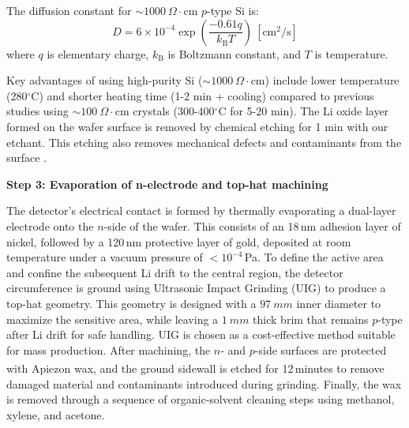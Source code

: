 \noindent The diffusion constant for \(\sim 1000~\Omega\cdot\text{cm}\) \(p\)-type Si is:
\begin{equation}
    D=6\times 10^{-4}\exp\left(\frac{-0.61q}{k_{\text{B}}T}\right)~\left[\text{cm}^2/\text{s}\right]
\end{equation}
\noindent where \(q\) is elementary charge, \(k_{\text{B}}\) is Boltzmann constant, and \(T\) is temperature.

\noindent Key advantages of using high-purity Si (\(\sim 1000~\Omega\cdot\text{cm}\)) include lower temperature (280\(^\circ\)C) and shorter heating time (1-2 min + cooling) compared to previous studies using \(\sim 100~\Omega\cdot\text{cm}\) crystals (300-400\(^\circ\)C for 5-20 min). The Li oxide layer formed on the wafer surface is removed by chemical etching for 1 min with our etchant. This etching also removes mechanical defects and contaminants from the surface \cite{KOZAI2019162695}.
\medskip

\noindent\textbf{Step 3: Evaporation of n-electrode and top-hat machining}

\noindent The detector's electrical contact is formed by thermally evaporating a dual-layer electrode onto the \(n\)-side of the wafer. This consists of an 18\,nm adhesion layer of nickel, followed by a 120\,nm protective layer of gold, deposited at room temperature under a vacuum pressure of \(<10^{-4}\)\,Pa. To define the active area and confine the subsequent Li drift to the central region, the detector circumference is ground using Ultrasonic Impact Grinding (UIG) to produce a top-hat geometry. This geometry is designed with a $97~mm$ inner diameter to maximize the sensitive area, while leaving a $1~mm$ thick brim that remains \(p\)-type after Li drift for safe handling. UIG is chosen as a cost-effective method suitable for mass production. After machining, the \(n\)- and \(p\)-side surfaces are protected with Apiezon\textsuperscript{\textregistered} wax, and the ground sidewall is etched for 12\,minutes to remove damaged material and contaminants introduced during grinding. Finally, the wax is removed through a sequence of organic-solvent cleaning steps using methanol, xylene, and acetone.

\medskip

